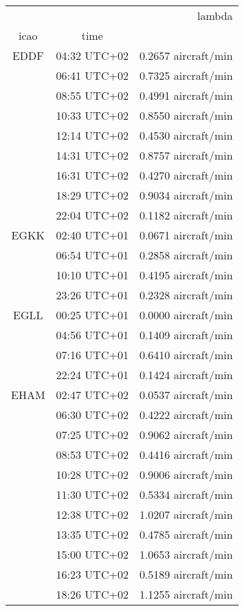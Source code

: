 \begin{tabular}{ccr}
\toprule
     &              &               lambda \\
icao & time &                      \\
\midrule
EDDF & 04:32 UTC+02 &  0.2657 aircraft/min \\
     & 06:41 UTC+02 &  0.7325 aircraft/min \\
     & 08:55 UTC+02 &  0.4991 aircraft/min \\
     & 10:33 UTC+02 &  0.8550 aircraft/min \\
     & 12:14 UTC+02 &  0.4530 aircraft/min \\
     & 14:31 UTC+02 &  0.8757 aircraft/min \\
     & 16:31 UTC+02 &  0.4270 aircraft/min \\
     & 18:29 UTC+02 &  0.9034 aircraft/min \\
     & 22:04 UTC+02 &  0.1182 aircraft/min \\
EGKK & 02:40 UTC+01 &  0.0671 aircraft/min \\
     & 06:54 UTC+01 &  0.2858 aircraft/min \\
     & 10:10 UTC+01 &  0.4195 aircraft/min \\
     & 23:26 UTC+01 &  0.2328 aircraft/min \\
EGLL & 00:25 UTC+01 &  0.0000 aircraft/min \\
     & 04:56 UTC+01 &  0.1409 aircraft/min \\
     & 07:16 UTC+01 &  0.6410 aircraft/min \\
     & 22:24 UTC+01 &  0.1424 aircraft/min \\
EHAM & 02:47 UTC+02 &  0.0537 aircraft/min \\
     & 06:30 UTC+02 &  0.4222 aircraft/min \\
     & 07:25 UTC+02 &  0.9062 aircraft/min \\
     & 08:53 UTC+02 &  0.4416 aircraft/min \\
     & 10:28 UTC+02 &  0.9006 aircraft/min \\
     & 11:30 UTC+02 &  0.5334 aircraft/min \\
     & 12:38 UTC+02 &  1.0207 aircraft/min \\
     & 13:35 UTC+02 &  0.4785 aircraft/min \\
     & 15:00 UTC+02 &  1.0653 aircraft/min \\
     & 16:23 UTC+02 &  0.5189 aircraft/min \\
     & 18:26 UTC+02 &  1.1255 aircraft/min \\

\end{tabular}
